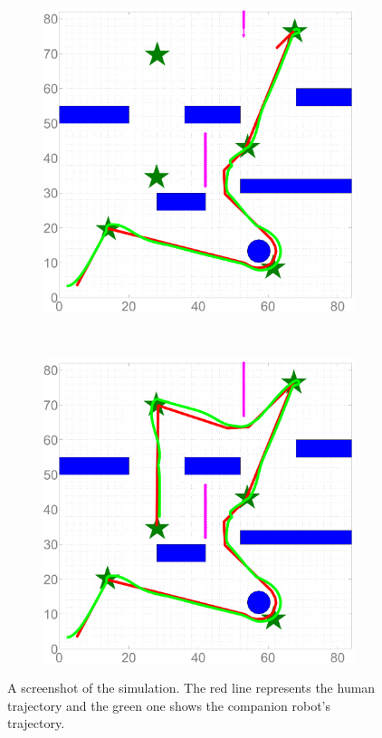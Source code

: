 \documentclass[journal]{IEEEtran}
\begin{document}
\begin{figure}
\begin{subfigure}{0.2\textwidth}
			\caption{}
			\label{fig:ref_traj_obs1}
		\end{subfigure}
		~
		\begin{subfigure}{0.2\textwidth}
			\includegraphics[width=\textwidth]{figures/sim_traj_obs2}
			\caption{}
			\label{fig:ref_traj_obs2}
		\end{subfigure}
		~
		\begin{subfigure}{0.2\textwidth}
			\includegraphics[width=\textwidth]{figures/sim_traj_end}
			\caption{}
			\label{fig:ref_traj_accom}
		\end{subfigure}
		\caption{A screenshot of the simulation. The red line represents the human trajectory and the green one shows the companion robot's trajectory.}
	\end{figure}		
	
\end{document}
